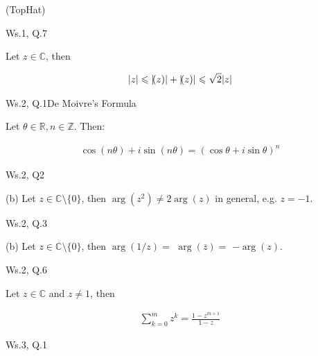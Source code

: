 \documentclass[10pt,landscape]{article}
\renewcommand{\leq}{\leqslant}
\let\Re\relax
\DeclareMathOperator{\Re}{Re}
\let\Im\relax
\DeclareMathOperator{\Im}{Im}
\begin{document}
\begin{multicols}{3}
\begin{remark}{(TopHat)}{}
\end{remark}

\begin{question}{Ws.1, Q.7}{}

    Let $z \in \mathbb{C}$, then

        \begin{align*}
            |z| \leq |\Re\!{(z)}| + |\Im\!{(z)}| \leq \sqrt{2}|z|
        \end{align*}

\end{question}

\begin{question}{Ws.2, Q.1}{De Moivre's Formula}

    Let $\theta \in \mathbb{R}, n \in \mathbb{Z}$. Then:

        \begin{align*}
            \cos(n\theta) + i\sin(n\theta) = (\cos{\theta} + i\sin{\theta})^n
        \end{align*}

\end{question}

\begin{question}{Ws.2, Q2}{}

    (b) Let $z \in \mathbb{C} \setminus \{0\}$, then $\arg(z^2) \neq 2\arg(z)$ in general, e.g. $z = -1$.

\end{question}

\begin{question}{Ws.2, Q.3}{}

    (b) Let $z \in \mathbb{C} \setminus \{0\}$, then $\arg(1/z) =$ $\arg(\overline{z}) =$ $-\arg(z)$.

\end{question}

\begin{question}{Ws.2, Q.6}{}

    Let $z \in \mathbb{C}$ and $z \neq 1$, then 

        \begin{align*}
            \sum_{k=0}^m z^k = \displaystyle \frac{1 - z^{m+1}}{1 - z}
        \end{align*}

\end{question}

\begin{question}{Ws.3, Q.1}{}


\end{question}
\end{multicols}
\end{document}
